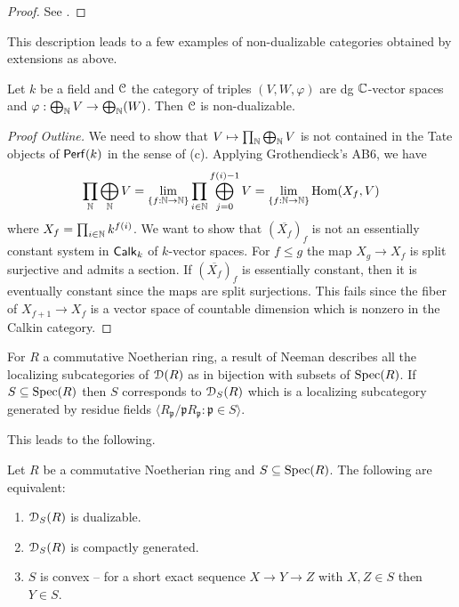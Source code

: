 \begin{proof}
    See \cite[Rmk. A.3.13]{HermetianII}. 
\end{proof}
This description leads to a few examples of non-dualizable categories obtained by extensions as above. 
\begin{proposition}
    Let $k$ be a field and $\EuScript{C}$ the category of triples $(V,W,\varphi)$ are dg $\mathbb{C}$-vector spaces and $\varphi:\bigoplus_{\mathbb{N}}V\to\bigoplus_{\mathbb{N}}(W)$. Then $\EuScript{C}$ is non-dualizable. 
\end{proposition}
\begin{proof}[Proof Outline]
    We need to show that $V\mapsto\prod_{\mathbb{N}}\bigoplus_{\mathbb{N}}V$ is not contained in the Tate objects of $\mathsf{Perf}(k)$ in the sense of  (c). Applying Grothendieck's AB6, we have 
    $$\prod_{\mathbb{N}}\bigoplus_{\mathbb{N}}V=\lim_{\{f:\mathbb{N}\to\mathbb{N}\}}\prod_{i\in \mathbb{N}}\bigoplus_{j=0}^{f(i)-1}V=\lim_{\{f:\mathbb{N}\to\mathbb{N}\}}\mathrm{Hom}(X_{f},V)$$
    where $X_{f}=\prod_{i\in\mathbb{N}}k^{f(i)}$. We want to show that $(\overline{X_{f}})_{f}$ is not an essentially constant system in $\mathsf{Calk}_{k}$ of $k$-vector spaces. For $f\leq g$ the map $X_{g}\to X_{f}$ is split surjective and admits a section. If $(\overline{X_{f}})_{f}$ is essentially constant, then it is eventually constant since the maps are split surjections. This fails since the fiber of $X_{f+1}\to X_{f}$ is a vector space of countable dimension which is nonzero in the Calkin category. 
\end{proof}

For $R$ a commutative Noetherian ring, a result of Neeman describes all the localizing subcategories of $\EuScript{D}(R)$ as in bijection with subsets of $\operatorname{Spec}(R)$. If $S\subseteq\operatorname{Spec}(R)$ then $S$ corresponds to $\EuScript{D}_{S}(R)$ which is a localizing subcategory generated by residue fields $\langle R_{\mathfrak{p}}/\mathfrak{p} R_{\mathfrak{p}}: \mathfrak{p}\in S\rangle$. 

This leads to the following. 
\begin{theorem}
    Let $R$ be a commutative Noetherian ring and $S\subseteq\operatorname{Spec}(R)$. The following are equivalent:
    \begin{enumerate}[label=(\alph*)]
        \item $\EuScript{D}_{S}(R)$ is dualizable. 
        \item $\EuScript{D}_{S}(R)$ is compactly generated. 
        \item $S$ is convex -- for a short exact sequence $X\to Y\to Z$ with $X,Z\in S$ then $Y\in S$. 
    \end{enumerate}
\end{theorem}